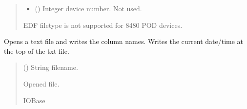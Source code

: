 \documentclass[letterpaper,10pt,english]{sphinxmanual}
\begin{document}
\begin{fulllineitems}
\begin{fulllineitems}
\begin{quote}
\begin{description}
\begin{itemize}
\item {} 
\sphinxAtStartPar
{} () \textendash{} Integer device number. Not used.

\end{itemize}

\sphinxAtStartPar
{} \textendash{} EDF filetype is not supported for 8480 POD devices.

\end{description}\end{quote}

\end{fulllineitems}


\begin{fulllineitems}
\label{\detokenize{Setup.SetupOneDevice:Setup.SetupOneDevice.Setup_8480SC.Setup8480SC._OpenSaveFile_TXT}}
\pysigstartsignatures
{}
\pysigstopsignatures
\sphinxAtStartPar
Opens a text file and writes the column names. Writes the current date/time             at the top of the txt file.
\begin{quote}\begin{description}
\sphinxAtStartPar
{} () \textendash{} String filename.

\sphinxAtStartPar
Opened file.

\sphinxAtStartPar
IOBase

\end{description}\end{quote}

\end{fulllineitems}



\end{fulllineitems}
\end{document}
